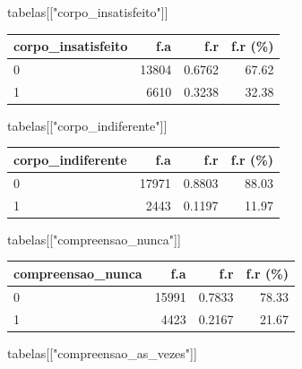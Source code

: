 \documentclass[
]{article}
\newenvironment{Shaded}{\begin{snugshade}}{\end{snugshade}}
\newcommand{\NormalTok}[1]{\textcolor[rgb]{0.00,0.23,0.31}{#1}}
\newcommand{\StringTok}[1]{\textcolor[rgb]{0.13,0.47,0.30}{#1}}
\begin{document}
\begin{Shaded}
\begin{Highlighting}[]
\NormalTok{tabelas[[}\StringTok{"corpo\_insatisfeito"}\NormalTok{]]}
\end{Highlighting}
\end{Shaded}

\begin{longtable}[]{@{}lrrr@{}}
\toprule()
corpo\_insatisfeito & f.a & f.r & f.r (\%) \\
\midrule()
\endhead
0 & 13804 & 0.6762 & 67.62 \\
1 & 6610 & 0.3238 & 32.38 \\
\bottomrule()
\end{longtable}

\begin{Shaded}
\begin{Highlighting}[]
\NormalTok{tabelas[[}\StringTok{"corpo\_indiferente"}\NormalTok{]]}
\end{Highlighting}
\end{Shaded}

\begin{longtable}[]{@{}lrrr@{}}
\toprule()
corpo\_indiferente & f.a & f.r & f.r (\%) \\
\midrule()
\endhead
0 & 17971 & 0.8803 & 88.03 \\
1 & 2443 & 0.1197 & 11.97 \\
\bottomrule()
\end{longtable}

\begin{Shaded}
\begin{Highlighting}[]
\NormalTok{tabelas[[}\StringTok{"compreensao\_nunca"}\NormalTok{]]}
\end{Highlighting}
\end{Shaded}

\begin{longtable}[]{@{}lrrr@{}}
\toprule()
compreensao\_nunca & f.a & f.r & f.r (\%) \\
\midrule()
\endhead
0 & 15991 & 0.7833 & 78.33 \\
1 & 4423 & 0.2167 & 21.67 \\
\bottomrule()
\end{longtable}

\begin{Shaded}
\begin{Highlighting}[]
\NormalTok{tabelas[[}\StringTok{"compreensao\_as\_vezes"}\NormalTok{]]}
\end{Highlighting}
\end{Shaded}
\end{document}

